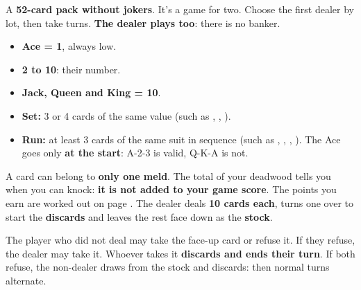 \documentclass[10pt]{article}
\begin{document}
A \textbf{52-card pack without jokers}. It’s a game for two. Choose the first dealer by lot, then take turns. \textbf{The dealer plays too}: there is no banker.
\begin{itemize}
 \item \textbf{Ace = 1}, always low.
 \item \textbf{2 to 10}: their number.
 \item \textbf{Jack, Queen and King = 10}.
\end{itemize}
\begin{itemize}
 \item \textbf{Set:} 3 or 4 cards of the same value (such as , , ).
 \item \textbf{Run:} at least 3 cards of the same suit in sequence (such as , , , ). The Ace goes only \textbf{at the start}: A-2-3 is valid, Q-K-A is not.
\end{itemize}
A card can belong to \textbf{only one meld}. The total of your deadwood tells you when you can knock: \textbf{it is not added to your game score}. The points you earn are worked out on page \pageref{gin-esempio}.
The dealer deals \textbf{10 cards each}, turns one over to start the \textbf{discards} and leaves the rest face down as the \textbf{stock}.

The player who did not deal may take the face-up card or refuse it. If they refuse, the dealer may take it. Whoever takes it \textbf{discards and ends their turn}. If both refuse, the non-dealer draws from the stock and discards: then normal turns alternate.
\end{document}
